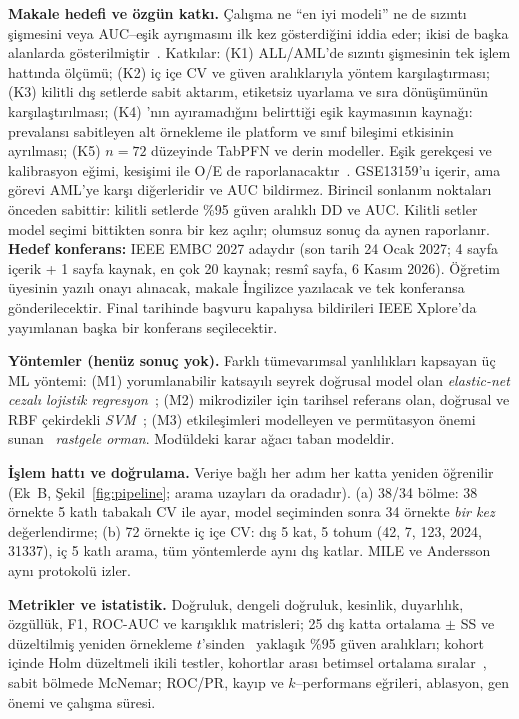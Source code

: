 \documentclass[conference]{IEEEtran}
\newcommand{\figref}[1]{Şekil~\ref{#1}}
\begin{document}
\textbf{Makale hedefi ve özgün katkı.} Çalışma ne ``en iyi modeli'' ne de sızıntı şişmesini veya
AUC--eşik ayrışmasını ilk kez gösterdiğini iddia eder; ikisi de başka alanlarda
gösterilmiştir~\cite{demircioglu2021,rosenblatt2024,zheng2026}. Katkılar: (K1) ALL/AML'de sızıntı şişmesinin
tek işlem hattında ölçümü; (K2) iç içe CV ve güven aralıklarıyla yöntem karşılaştırması; (K3) kilitli dış
setlerde sabit aktarım, etiketsiz uyarlama ve sıra dönüşümünün karşılaştırılması; (K4) \cite{zheng2026}'nın
ayıramadığını belirttiği eşik kaymasının kaynağı: prevalansı sabitleyen alt örnekleme ile platform ve
sınıf bileşimi etkisinin ayrılması; (K5) $n=72$ düzeyinde TabPFN ve derin modeller. Eşik gerekçesi ve
kalibrasyon eğimi, kesişimi ile O/E de raporlanacaktır~\cite{collins2024tripod,riley2024part2}.
\cite{warnatherresthal2020} GSE13159'u içerir, ama görevi AML'ye karşı diğerleridir ve AUC bildirmez.
Birincil sonlanım noktaları önceden sabittir: kilitli setlerde \%95 güven aralıklı DD ve AUC. Kilitli
setler model seçimi bittikten sonra bir kez açılır; olumsuz sonuç da aynen raporlanır.
\textbf{Hedef konferans:} IEEE EMBC 2027 adaydır (son tarih 24 Ocak 2027; 4 sayfa içerik + 1 sayfa
kaynak, en çok 20 kaynak; resmî sayfa, 6 Kasım 2026). Öğretim üyesinin yazılı onayı alınacak, makale
İngilizce yazılacak ve tek konferansa gönderilecektir. Final tarihinde başvuru kapalıysa bildirileri
IEEE Xplore'da yayımlanan başka bir konferans seçilecektir.

\textbf{Yöntemler (henüz sonuç yok).} Farklı tümevarımsal yanlılıkları kapsayan üç ML yöntemi:
(M1) yorumlanabilir katsayılı seyrek doğrusal model olan \emph{elastic-net cezalı lojistik
regresyon}~\cite{zou2005}; (M2) mikrodiziler için tarihsel referans olan, doğrusal ve RBF çekirdekli
\emph{SVM}~\cite{furey2000,guyon2002}; (M3) etkileşimleri modelleyen ve permütasyon önemi
sunan~\cite{breiman2001,diazuriarte2006} \emph{rastgele orman}. Modüldeki karar ağacı taban modeldir.

\textbf{İşlem hattı ve doğrulama.} Veriye bağlı her adım her katta yeniden öğrenilir (Ek~B,
\figref{fig:pipeline}; arama uzayları da oradadır). (a) 38/34 bölme: 38 örnekte 5 katlı tabakalı CV ile
ayar, model seçiminden sonra 34 örnekte \emph{bir kez} değerlendirme; (b) 72 örnekte iç içe CV: dış 5
kat, 5 tohum (42, 7, 123, 2024, 31337), iç 5 katlı arama, tüm yöntemlerde aynı dış katlar. MILE ve
Andersson aynı protokolü izler.

\textbf{Metrikler ve istatistik.} Doğruluk, dengeli doğruluk, kesinlik, duyarlılık, özgüllük, F1,
ROC-AUC ve karışıklık matrisleri; 25 dış katta ortalama $\pm$ SS ve düzeltilmiş yeniden örnekleme
$t$'sinden~\cite{nadeau2003} yaklaşık \%95 güven aralıkları; kohort içinde Holm düzeltmeli ikili
testler, kohortlar arası betimsel ortalama sıralar~\cite{demsar2006}, sabit bölmede McNemar; ROC/PR,
kayıp ve $k$--performans eğrileri, ablasyon, gen önemi ve çalışma süresi.
\end{document}
